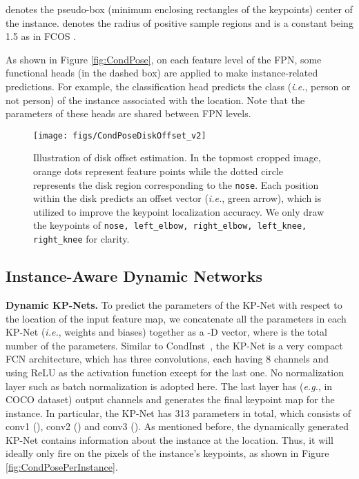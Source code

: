 \documentclass[sigconf]{acmart}
\begin{document}
denotes the pseudo-box (minimum enclosing rectangles of the keypoints) center of the instance.
 denotes the radius of positive sample regions and is a constant being 1.5 as in FCOS \cite{tian2019fcos}.

As shown in Figure \ref{fig:CondPose}, on each feature level of the FPN, some functional heads (in the dashed box) are applied to make instance-related predictions. For example, the classification head predicts the class (\textit{i.e.}, person or not person) of the instance associated with the location.
Note that the parameters of these heads are shared between FPN levels.


\begin{figure}[t]
  \centering
  \texttt{[image: figs/CondPoseDiskOffset\_v2]}
\caption{Illustration of disk offset estimation. In the topmost cropped image, orange dots represent feature points while the dotted circle represents the disk region corresponding to the \texttt{nose}. Each position within the disk predicts an offset vector (\textit{i.e.}, green arrow), which is utilized to improve the keypoint localization accuracy. We only draw the keypoints of \texttt{nose, left\_elbow, right\_elbow, left\_knee, right\_knee} for clarity.}
  \label{fig:CondPoseDiskOffset}
\end{figure}


\subsection{Instance-Aware Dynamic Networks}

\textbf{Dynamic KP-Nets.}\quad
To predict the parameters  of the KP-Net with respect to the location  of the input feature map, we concatenate all the parameters in each KP-Net (\emph{i.e.}, weights and biases) together as a -D vector, where  is the total number of the parameters.
Similar to CondInst~\cite{tian2020conditional}, the KP-Net is a very compact FCN architecture, which has three  convolutions, each having 8 channels and using ReLU as the activation function except for the last one.
No normalization layer such as batch normalization \cite{ioffe2015batch} is adopted here. 
The last layer has  (\textit{e.g.},  in COCO \cite{lin2014microsoft} dataset) output channels and generates the final keypoint map for the instance.
In particular, the KP-Net has 313 parameters in total, which consists of conv1  (), conv2 () and conv3 ().
As mentioned before, the dynamically generated KP-Net contains information about the instance at the location. Thus, it will ideally only fire on the pixels of the instance's keypoints, as shown in Figure \ref{fig:CondPosePerInstance}.
\end{document}
